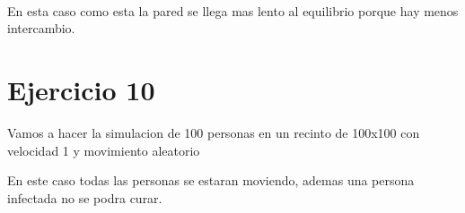 \documentclass[11pt]{article}
\begin{document}
    \begin{center}
    \end{center}
    { \hspace*{\fill} \\}
    
    En esta caso como esta la pared se llega mas lento al equilibrio porque
hay menos intercambio.

    \hypertarget{ejercicio-10}{%
\section{Ejercicio 10}\label{ejercicio-10}}

    Vamos a hacer la simulacion de 100 personas en un recinto de 100x100 con
velocidad 1 y movimiento aleatorio

    En este caso todas las personas se estaran moviendo, ademas una persona
infectada no se podra curar.
\end{document}
